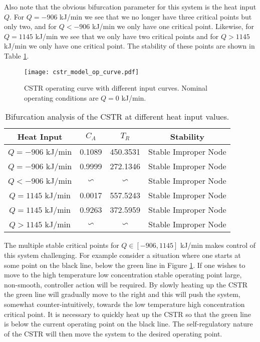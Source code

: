 Also note that the obvious bifurcation parameter for this system is the heat input $Q$. For $Q = -906$ kJ/min we see that we no longer have three critical points but only two, and for $Q < -906$ kJ/min we only have one critical point. Likewise, for $Q = 1145$ kJ/min we see that we only have two critical points and for $Q > 1145$ kJ/min we only have one critical point. The stability of these points are shown in Table \ref{tab_bifurc}.  
\begin{figure}[H] 
\centering
\texttt{[image: cstr\_model\_op\_curve.pdf]}
\caption{CSTR operating curve with different input curves. Nominal operating conditions are $Q=0$ kJ/min.}
\label{fig_cstr_op_curve}
\end{figure}
\begin{table}[H]
\begin{center}
\begin{tabular}{c c c c}
\hline
Heat Input & $C_A$ & $T_R$ & Stability\\
\hline
$Q = -906$ kJ/min & 0.1089 & 450.3531 & Stable Improper Node\\
$Q = -906$ kJ/min & 0.9999 & 272.1346 & Stable Improper Node \\
$Q < -906$ kJ/min & $\backsim$ & $\backsim$ & Stable Improper Node \\
\hline
$Q = 1145$ kJ/min & 0.0017 & 557.5243 & Stable Improper Node\\
$Q = 1145$ kJ/min & 0.9263 & 372.5959 & Stable Improper Node \\
$Q > 1145$ kJ/min & $\backsim$ & $\backsim$ & Stable Improper Node \\
\hline
\end{tabular}
\caption{Bifurcation analysis of the CSTR at different heat input values.}
\label{tab_bifurc}
\end{center}
\end{table}
The multiple stable critical points for $Q\in [-906, 1145]$ kJ/min makes control of this system challenging. For example consider a situation where one starts at some point on the black line, below the green line in Figure \ref{fig_cstr_op_curve}. If one wishes to move to the high temperature low concentration stable operating point large, non-smooth, controller action will be required. By slowly heating up the CSTR the green line will gradually move to the right and this will push the system, somewhat counter-intuitively, towards the low temperature high concentration critical point. It is necessary to quickly heat up the CSTR so that the green line is below the current operating point on the black line. The self-regulatory nature of the CSTR will then move the system to the desired operating point.   

